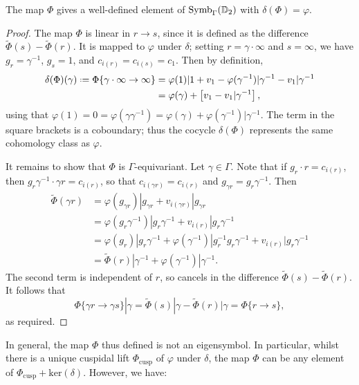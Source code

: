 \documentclass[a4paper,11pt]{article}
\numberwithin{equation}{section}
\begin{document}
	\begin{proposition}
		The map $\Phi$ gives a well-defined element of $\mathrm{Symb}_{\Gamma}(\mathbb{D}_2)$ with $\delta(\Phi) = \varphi$.
	\end{proposition}
	\begin{proof}
		The map $\Phi$ is linear in $r \to s$, since it is defined as the difference $\widetilde{\Phi}(s) - \widetilde{\Phi}(r)$. It is mapped to $\varphi$ under $\delta$; setting $r = \gamma\cdot\infty$ and $s = \infty$, we have $g_r = \gamma^{-1}$, $g_s = 1$, and $c_{i(r)} = c_{i(s)} = c_1$. Then by definition,
		\begin{align*}
			\delta(\Phi)(\gamma) \defeq \Phi\{\gamma\cdot\infty \to \infty\} &= \varphi(1)|1 + v_1 - \varphi(\gamma^{-1})|\gamma^{-1} - v_1|\gamma^{-1}\\
									&= \varphi(\gamma) + \left[v_1 - v_1|\gamma^{-1}\right],
		\end{align*}
		using that $\varphi(1) = 0 = \varphi(\gamma\gamma^{-1}) = \varphi(\gamma) + \varphi(\gamma^{-1})|\gamma^{-1}$. The term in the square brackets is a coboundary; thus the cocycle $\delta(\Phi)$ represents the same cohomology class as $\varphi$.

		It remains to show that $\Phi$ is $\Gamma$-equivariant. Let $\gamma \in \Gamma$. Note that if $g_r \cdot r = c_{i(r)}$, then $g_r\gamma^{-1} \cdot \gamma r = c_{i(r)}$, so that $c_{i(\gamma r)} = c_{i(r)}$ and $g_{\gamma r} = g_r\gamma^{-1}$. Then
		\begin{align*}
			\widetilde{\Phi}(\gamma r) &= \varphi(g_{\gamma r})|g_{\gamma r} + v_{i(\gamma r)}|g_{\gamma r}\\
					 &= \varphi(g_r \gamma^{-1})|g_r\gamma^{-1} + v_{i(r)}|g_r\gamma^{-1}\\
						&= \varphi(g_r)|g_r\gamma^{-1} + \varphi(\gamma^{-1})|g_r^{-1}g_r\gamma^{-1} + v_{i(r)}|g_r\gamma^{-1}\\
						&= \widetilde{\Phi}(r)|\gamma^{-1} + \varphi(\gamma^{-1})|\gamma^{-1}.
		\end{align*}
		The second term is independent of $r$, so cancels in the difference $\widetilde{\Phi}(s) - \widetilde{\Phi}(r)$. It follows that
		\[
			\Phi\{\gamma r \to \gamma s\}|\gamma = \widetilde{\Phi}(s)|\gamma - \widetilde{\Phi}(r)|\gamma = \Phi\{r\to s\},
		\]
		as required.
	\end{proof}

In general, the map $\Phi$ thus defined is not an eigensymbol. In particular, whilst there is a unique cuspidal lift $\Phi_{\mathrm{cusp}}$ of $\varphi$ under $\delta$, the map $\Phi$ can be any element of $\Phi_{\mathrm{cusp}} + \mathrm{ker}(\delta)$. However, we have:
\end{document}
